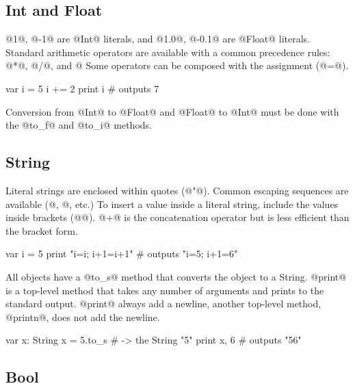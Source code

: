 \subsection{Int and Float}\label{Int}\label{Float}

@1@, @-1@ are @Int@ literals, and @1.0@, @-0.1@ are @Float@ literals.
Standard arithmetic operators are available with a common precedence rules: @*@, @/@, and @%
Some operators can be composed with the assignment (@=@). 
\begin{lst}
var i = 5
i += 2
print i # outputs 7
\end{lst}

Conversion from @Int@ to @Float@ and @Float@ to @Int@ must be done with the @to_f@ and @to_i@ methods.

\subsection{String}\label{String}

Literal strings are enclosed within quotes (@"@).
Common escaping sequences are available (@\n@, @\t@, etc.)
To insert a value inside a literal string, include the values inside brackets (@{}@).
@+@ is the concatenation operator but is less efficient than the bracket form.

\begin{lst}
var i = 5
print "i={i}; i+1={i+1}" # outputs "i=5; i+1=6"
\end{lst}

All objects have a @to_s@ method that converts the object to a String.
@print@ is a top-level method that takes any number of arguments and prints to the standard output.
@print@ always add a newline, another top-level method, @printn@, does not add the newline.

\begin{lst}
var x: String
x = 5.to_s # -> the String "5"
print x, 6 # outputs "56"
\end{lst}

\subsection{Bool}\label{Bool}\label{is}

